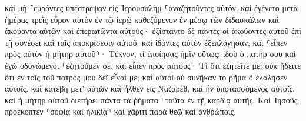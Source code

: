 \documentclass{openreader}
\begin{document}
καὶ μὴ ⸀εὑρόντες ὑπέστρεψαν εἰς Ἰερουσαλὴμ ⸀ἀναζητοῦντες αὐτόν. 
καὶ ἐγένετο μετὰ ἡμέρας τρεῖς εὗρον αὐτὸν ἐν τῷ ἱερῷ καθεζόμενον ἐν μέσῳ τῶν διδασκάλων καὶ ἀκούοντα αὐτῶν καὶ ἐπερωτῶντα αὐτούς· 
ἐξίσταντο δὲ πάντες οἱ ἀκούοντες αὐτοῦ ἐπὶ τῇ συνέσει καὶ ταῖς ἀποκρίσεσιν αὐτοῦ. 
καὶ ἰδόντες αὐτὸν ἐξεπλάγησαν, καὶ ⸂εἶπεν πρὸς αὐτὸν ἡ μήτηρ αὐτοῦ⸃· Τέκνον, τί ἐποίησας ἡμῖν οὕτως; ἰδοὺ ὁ πατήρ σου καὶ ἐγὼ ὀδυνώμενοι ⸀ἐζητοῦμέν σε. 
καὶ εἶπεν πρὸς αὐτούς· Τί ὅτι ἐζητεῖτέ με; οὐκ ᾔδειτε ὅτι ἐν τοῖς τοῦ πατρός μου δεῖ εἶναί με; 
καὶ αὐτοὶ οὐ συνῆκαν τὸ ῥῆμα ὃ ἐλάλησεν αὐτοῖς. 
καὶ κατέβη μετ’ αὐτῶν καὶ ἦλθεν εἰς Ναζαρὲθ, καὶ ἦν ὑποτασσόμενος αὐτοῖς. καὶ ἡ μήτηρ αὐτοῦ διετήρει πάντα τὰ ῥήματα ⸀ταῦτα ἐν τῇ καρδίᾳ αὐτῆς. 
Καὶ Ἰησοῦς προέκοπτεν ⸂σοφίᾳ καὶ ἡλικίᾳ⸃ καὶ χάριτι παρὰ θεῷ καὶ ἀνθρώποις. 
\end{document}
